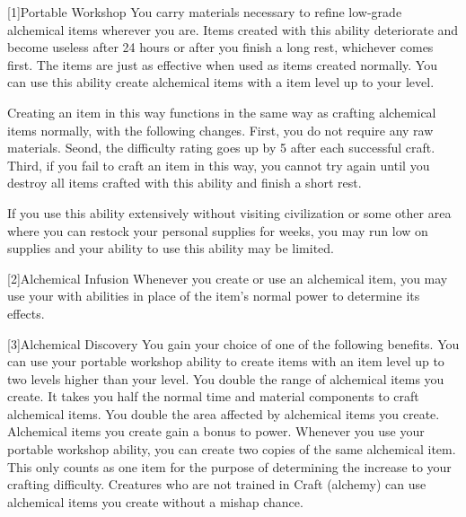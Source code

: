         [1]{Portable Workshop} 
        You carry materials necessary to refine low-grade alchemical items wherever you are.
        Items created with this ability deteriorate and become useless after 24 hours or after you finish a long rest, whichever comes first.
        The items are just as effective when used as items created normally.
        You can use this ability create alchemical items with a item level up to your level.

        Creating an item in this way functions in the same way as crafting alchemical items normally, with the following changes.
        First, you do not require any raw materials.
        Seond, the difficulty rating goes up by 5 after each successful craft.
        Third, if you fail to craft an item in this way, you cannot try again until you destroy all items crafted with this ability and finish a short rest.

        If you use this ability extensively without visiting civilization or some other area where you can restock your personal supplies for weeks, you may run low on supplies and your ability to use this ability may be limited.

        [2]{Alchemical Infusion} Whenever you create or use an alchemical item, you may use your  with  abilities in place of the item's normal power to determine its effects.

        [3]{Alchemical Discovery} You gain your choice of one of the following benefits.
        {
             You can use your portable workshop ability to create items with an item level up to two levels higher than your level.
             You double the range of alchemical items you create.
             It takes you half the normal time and material components to craft alchemical items.
             You double the area affected by alchemical items you create.
             Alchemical items you create gain a  bonus to power.
             Whenever you use your portable workshop ability, you can create two copies of the same alchemical item.
            This only counts as one item for the purpose of determining the increase to your crafting difficulty.
             Creatures who are not trained in Craft (alchemy) can use alchemical items you create without a mishap chance.
        }

